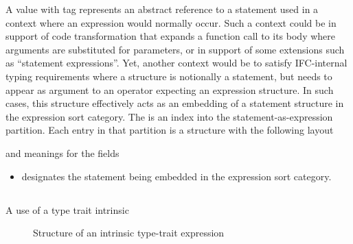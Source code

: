 A  value with tag  represents an abstract reference to a statement used
 in a context where an expression would normally occur.  Such a context could be in support of code transformation that
expands a function call to its body where arguments are substituted for parameters, or in support of some extensions
such as ``statement expressions''.  Yet, another context would be to satisfy IFC-internal typing requirements 
where a structure is notionally a statement, but needs to appear as argument to an operator expecting an expression
structure.  In such cases, this structure effectively acts as an embedding of a statement structure in the 
expression sort category.  The  is an index into the statement-as-expression partition.
Each entry in that partition is a structure with the following layout
%
\begin{figure}[H]
	\centering
\end{figure}
%
and meanings for the fields
\begin{itemize}
	\item {} designates the statement being embedded in the expression sort category.
\end{itemize}


\subsection{}
\label{sec:ifc:ExprSort:TypeTraitIntrinsic}

A use of a type trait intrinsic

%
\begin{figure}[H]
	\centering
	\caption{Structure of an intrinsic type-trait expression}
	\label{fig:ifc-type-trait-expression-structure}
\end{figure}



